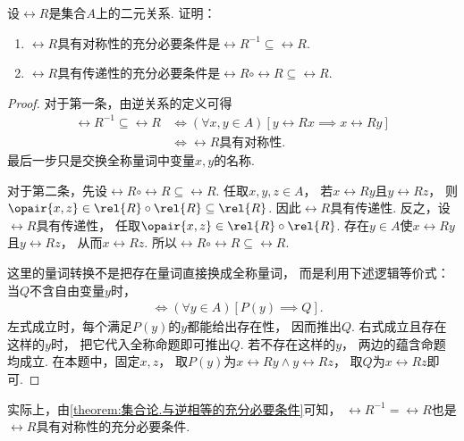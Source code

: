 \begin{example}
    设\(\rel{R}\)是集合\(A\)上的二元关系.
    证明：
    \begin{enumerate}
        \item \(\rel{R}\)具有对称性的充分必要条件是\(\rel{R}^{-1}\subseteq\rel{R}\).
        \item \(\rel{R}\)具有传递性的充分必要条件是\(\rel{R}\circ\rel{R}\subseteq\rel{R}\).
    \end{enumerate}
    \begin{proof}
        对于第一条，由逆关系的定义可得
        \begin{align*}
            \rel{R}^{-1}\subseteq\rel{R}
            &\iff(\forall x,y\in A)[y\rel{R}x\implies x\rel{R}y]\\
            &\iff\text{\(\rel{R}\)具有对称性}.
        \end{align*}
        最后一步只是交换全称量词中变量\(x,y\)的名称.

        对于第二条，先设\(\rel{R}\circ\rel{R}\subseteq\rel{R}\).
        任取\(x,y,z\in A\)，
        若\(x\rel{R}y\)且\(y\rel{R}z\)，
        则\(\opair{x,z}\in\rel{R}\circ\rel{R}\subseteq\rel{R}\).
        因此\(\rel{R}\)具有传递性.
        反之，设\(\rel{R}\)具有传递性，
        任取\(\opair{x,z}\in\rel{R}\circ\rel{R}\).
        存在\(y\in A\)使\(x\rel{R}y\)且\(y\rel{R}z\)，
        从而\(x\rel{R}z\).
        所以\(\rel{R}\circ\rel{R}\subseteq\rel{R}\).

        这里的量词转换不是把存在量词直接换成全称量词，
        而是利用下述逻辑等价式：当\(Q\)不含自由变量\(y\)时，
        \begin{align*}
            [((\exists y\in A)P(y))\implies Q]
            &\iff(\forall y\in A)[P(y)\implies Q].
        \end{align*}
        左式成立时，每个满足\(P(y)\)的\(y\)都能给出存在性，
        因而推出\(Q\).
        右式成立且存在这样的\(y\)时，
        把它代入全称命题即可推出\(Q\).
        若不存在这样的\(y\)，
        两边的蕴含命题均成立.
        在本题中，固定\(x,z\)，
        取\(P(y)\)为\(x\rel{R}y\land y\rel{R}z\)，
        取\(Q\)为\(x\rel{R}z\)即可.
    \end{proof}
\end{example}
实际上，由\cref{theorem:集合论.与逆相等的充分必要条件}可知，
\(\rel{R}^{-1}=\rel{R}\)也是\(\rel{R}\)具有对称性的充分必要条件.

